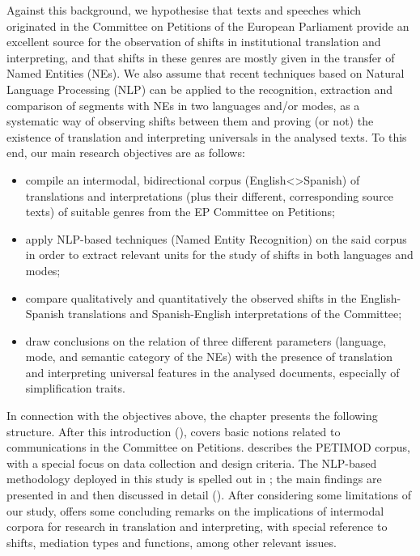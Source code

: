 \documentclass[output=paper]{langscibook}
\begin{document}
Against this background, we hypothesise that texts and speeches which originated in the Committee on Petitions of the European Parliament provide an excellent source for the observation of shifts in institutional translation and interpreting, and that shifts in these genres are mostly given in the transfer of Named Entities (NEs). We also assume that recent techniques based on Natural Language Processing (NLP) can be applied to the recognition, extraction and comparison of segments with NEs in two languages and/or modes, as a systematic way of observing shifts between them and proving (or not) the existence of translation and interpreting universals in the analysed texts. To this end, our main research objectives are as follows: 

\begin{itemize}
\item 
compile an intermodal, bidirectional corpus (English<>Spanish) of translations and interpretations (plus their different, corresponding source texts) of suitable genres from the EP Committee on Petitions;
\item 
apply NLP-based techniques (Named Entity Recognition) on the said corpus in order to extract relevant units for the study of shifts in both languages and modes;
\item 
compare qualitatively and quantitatively the observed shifts in the English-Spanish translations and Spanish-English interpretations of the Committee;
\item 
draw conclusions on the relation of three different parameters (language, mode, and semantic category of the NEs) with the presence of translation and interpreting universal features in the analysed documents, especially of simplification traits.
\end{itemize}

In connection with the objectives above, the chapter presents the following structure. After this introduction (),  covers basic notions related to communications in the Committee on Petitions.  describes the PETIMOD corpus, with a special focus on data collection and design criteria. The NLP-based methodology deployed in this study is spelled out in ; the main findings are presented in  and then discussed in detail (). After considering some limitations of our study,  offers some concluding remarks on the implications of intermodal corpora for research in translation and interpreting, with special reference to shifts, mediation types and functions, among other relevant issues.
\end{document}
